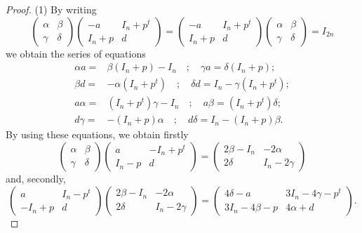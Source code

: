 \documentclass[12pt]{amsart}
\numberwithin{equation}{section}
\begin{document}
\begin{proof} (1) By writing
\begin{equation*}\begin{pmatrix} \alpha &\beta \\
\gamma & \delta  \end{pmatrix} \begin{pmatrix} -a&I_n+p^t\\
I_n+p&d \end{pmatrix}=\begin{pmatrix} -a&I_n+p^t\\
I_n+p&d \end{pmatrix}\begin{pmatrix} \alpha &\beta \\
\gamma & \delta  \end{pmatrix} =I_{2n}
\end{equation*} 
we obtain the series of equations
\begin{align*}\alpha a=&\beta (I_n+p)-I_n\quad; \quad \gamma a=\delta (I_n+p);\\
\beta d=&-\alpha (I_n+p^t)\quad; \quad \delta d=I_n-\gamma (I_n+p^t);\\
a \alpha =&(I_n+p^t)\gamma -I_n\quad; \quad a\beta=(I_n+p^t)\delta;\\
d\gamma=&-(I_n+p)\alpha \quad; \quad d\delta=I_n-(I_n+p)\beta.
\end{align*}
By using these equations, we obtain firstly
\begin{equation*}\begin{pmatrix} \alpha &\beta \\
\gamma & \delta  \end{pmatrix} \begin{pmatrix} a&-I_n+p^t\\
I_n-p&d \end{pmatrix}=\begin{pmatrix} 2\beta-I_n &-2\alpha \\
2\delta & I_n-2\gamma  \end{pmatrix}\end{equation*}
and, secondly,
\begin{equation*}\begin{pmatrix} a&I_n-p^t\\
-I_n+p&d \end{pmatrix}\begin{pmatrix} 2\beta-I_n &-2\alpha \\
2\delta & I_n-2\gamma  \end{pmatrix}= 
\begin{pmatrix}4\delta -a&3I_n-4\gamma -p^t\\
3I_n-4\beta-p&4\alpha+d \end{pmatrix}.
\end{equation*}


\end{proof}
\end{document}
